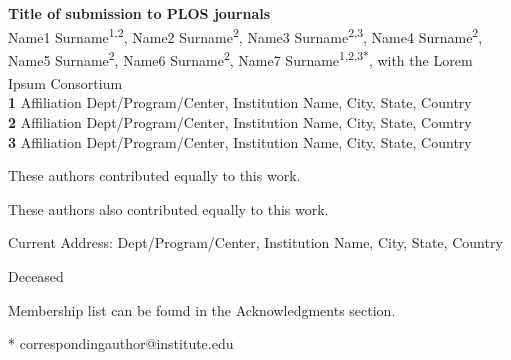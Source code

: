 \documentclass[10pt,letterpaper]{article}
\begin{document}
\vspace*{0.2in}

\begin{flushleft}
{\Large
\textbf{Title of submission to PLOS journals} %
}
\newline
\\
Name1 Surname\textsuperscript{1,2\Yinyang},
Name2 Surname\textsuperscript{2\Yinyang},
Name3 Surname\textsuperscript{2,3\textcurrency},
Name4 Surname\textsuperscript{2},
Name5 Surname\textsuperscript{2\ddag},
Name6 Surname\textsuperscript{2\ddag},
Name7 Surname\textsuperscript{1,2,3*},
with the Lorem Ipsum Consortium\textsuperscript{\textpilcrow}
\\
\bigskip
\textbf{1} Affiliation Dept/Program/Center, Institution Name, City, State, Country
\\
\textbf{2} Affiliation Dept/Program/Center, Institution Name, City, State, Country
\\
\textbf{3} Affiliation Dept/Program/Center, Institution Name, City, State, Country
\\
\bigskip

% 
%
\Yinyang These authors contributed equally to this work.

\ddag These authors also contributed equally to this work.

\textcurrency Current Address: Dept/Program/Center, Institution Name, City, State, Country %

\dag Deceased

\textpilcrow Membership list can be found in the Acknowledgments section.

* correspondingauthor@institute.edu

\end{flushleft}
\end{document}
